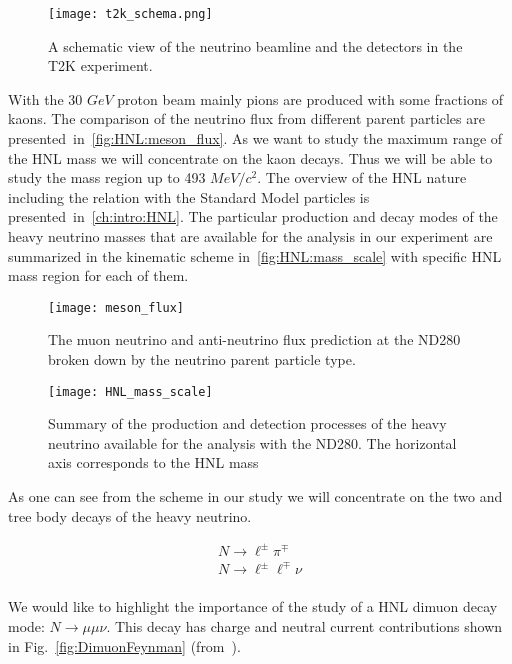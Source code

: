 \documentclass[../main.tex]{subfiles}
\begin{document}
\begin{figure}[!ht]
    \centering
    \texttt{[image: t2k\_schema.png]}
    \caption{A schematic view of the neutrino beamline and the detectors in the T2K experiment.}
    \label{fig:HNL:t2k_schema}
\end{figure}

With the 30 $GeV$ proton beam mainly pions are produced with some fractions of kaons. The comparison of the neutrino flux from different parent particles are presented~in~\autoref{fig:HNL:meson_flux}. As we want to study the maximum range of the HNL mass we will concentrate on the kaon decays. Thus we will be able to study the mass region up to 493 $MeV/c^2$. The overview of the HNL nature including the relation with the Standard Model particles is presented~in~\autoref{ch:intro:HNL}. The particular production and decay modes of the heavy neutrino masses that are available for the analysis in our experiment are summarized in the kinematic scheme in~\autoref{fig:HNL:mass_scale} with specific HNL mass region for each of them.

\begin{figure}[!ht]
    \centering
    \texttt{[image: meson\_flux]}
    \caption{The muon neutrino and anti-neutrino flux prediction at the ND280 broken down by the neutrino parent particle type.}
    \label{fig:HNL:meson_flux}
\end{figure}

\begin{figure}[!ht]
    \centering
    \texttt{[image: HNL\_mass\_scale]}
    \caption{Summary of the production and detection processes of the heavy neutrino available for the analysis with the ND280. The horizontal axis corresponds to the HNL mass}
    \label{fig:HNL:mass_scale}
\end{figure}

As one can see from the scheme in our study we will concentrate on the two and tree body decays of the heavy neutrino.

\begin{eqnarray}
    &N\to\ell^{\pm}\pi^{\mp} &\\
    &N\to\ell^{\pm}\ell^{\mp}\nu & \\
\end{eqnarray}

We would like to highlight the importance of the study of a HNL dimuon decay mode: $N\to\mu\mu\nu$. This decay has charge and neutral current contributions shown in Fig.~\ref{fig:DimuonFeynman} (from~\cite{Johnson1997}).
\end{document}
